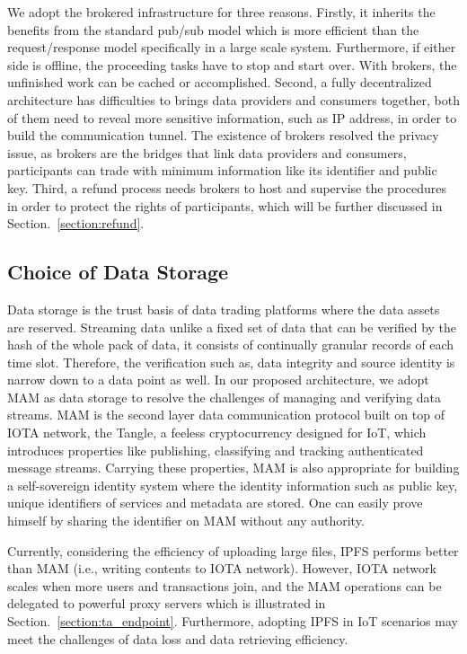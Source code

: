 \begin{spacing}{2.0}
We adopt the brokered infrastructure for three reasons. Firstly, it inherits the benefits from the standard pub/sub model which is more efficient than the request/response model specifically in a large scale system. Furthermore, if either side is offline, the proceeding tasks have to stop and start over. With brokers, the unfinished work can be cached or accomplished. Second, a fully decentralized architecture has difficulties to brings data providers and consumers together, both of them need to reveal more sensitive information, such as IP address, in order to build the communication tunnel. The existence of brokers resolved the privacy issue, as brokers are the bridges that link data providers and consumers, participants can trade with minimum information like its identifier and public key. Third, a refund process needs brokers to host and supervise the procedures in order to protect the rights of participants, which will be further discussed in Section.~\ref{section:refund}.

\subsection{Choice of Data Storage}
Data storage is the trust basis of data trading platforms where the data assets are reserved. Streaming data unlike a fixed set of data that can be verified by the hash of the whole pack of data, it consists of continually granular records of each time slot. Therefore, the verification such as, data integrity and source identity is narrow down to a data point as well. In our proposed architecture, we adopt MAM as data storage to resolve the challenges of managing and verifying data streams. MAM is the second layer data communication protocol built on top of IOTA\cite{IOTAwhitepaper} network, the Tangle, a feeless cryptocurrency designed for IoT, which introduces properties like publishing, classifying and tracking authenticated message streams. Carrying these properties, MAM is also appropriate for building a self-sovereign identity system where the identity information such as public key, unique identifiers of services and metadata are stored. One can easily prove himself by sharing the identifier on MAM without any authority.

Currently, considering the efficiency of uploading large files, IPFS performs better than MAM (i.e., writing contents to IOTA network). However, IOTA network scales when more users and transactions join, and the MAM operations can be delegated to powerful proxy servers which is illustrated in Section.~\ref{section:ta_endpoint}. Furthermore, adopting IPFS in IoT scenarios may meet the challenges of data loss and data retrieving efficiency.


\end{spacing}
